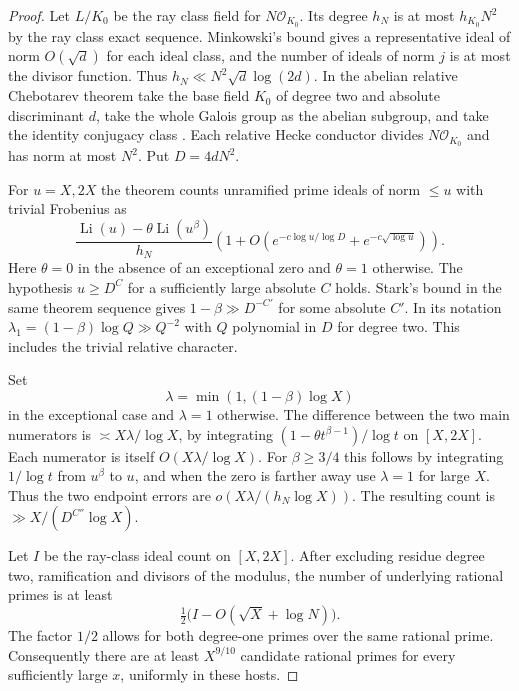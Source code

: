\begin{proof}
Let \(L/K_0\) be the ray class field for \(N\mathcal O_{K_0}\).
Its degree \(h_N\) is at most \(h_{K_0}N^2\) by the ray class
exact sequence. Minkowski's bound gives a representative ideal
of norm \(O(\sqrt d)\) for each ideal class, and the number of
ideals of norm \(j\) is at most the divisor function. Thus
\(h_N\ll N^2\sqrt d\log(2d)\).
In the abelian relative Chebotarev theorem take the base field
\(K_0\) of degree two and absolute discriminant \(d\), take
the whole Galois group as the abelian subgroup, and take the
identity conjugacy class \cite[Theorems 1.4 and 3.3]{tz-chebotarev}.
Each relative Hecke conductor divides \(N\mathcal O_{K_0}\)
and has norm at most \(N^2\). Put \(D=4dN^2\).

For
\(u=X,2X\) the theorem counts unramified prime ideals of norm
\(\le u\) with trivial Frobenius as
\[
 \frac{\operatorname{Li}(u)-\theta\operatorname{Li}(u^\beta)}
 {h_N}\left(1+O\left(
 e^{-c\log u/\log D}+e^{-c\sqrt{\log u}}\right)\right).
\]
Here \(\theta=0\) in the absence of an exceptional zero and
\(\theta=1\) otherwise. The hypothesis \(u\ge D^{C}\) for
a sufficiently large absolute \(C\) holds. Stark's bound in
the same theorem sequence gives \(1-\beta\gg D^{-C'}\) for
some absolute \(C'\). In its notation
\(\lambda_1=(1-\beta)\log Q\gg Q^{-2}\) with \(Q\) polynomial
in \(D\) for degree two. This includes the trivial relative
character.

Set
\[
 \lambda=\min(1,(1-\beta)\log X)
\]
in the exceptional
case and \(\lambda=1\) otherwise. The difference between the
two main numerators is \(\asymp X\lambda/\log X\), by integrating
\((1-\theta t^{\beta-1})/\log t\) on \([X,2X]\). Each numerator
is itself \(O(X\lambda/\log X)\). For \(\beta\ge3/4\) this
follows by integrating \(1/\log t\) from \(u^\beta\) to \(u\),
and when the zero is farther away use \(\lambda=1\) for large
\(X\). Thus the two endpoint errors are \(o(X\lambda/(h_N\log X))\).
The resulting count is \(\gg X/(D^{C''}\log X)\).

Let \(I\) be the ray-class ideal count on \([X,2X]\). After excluding residue degree two, ramification and divisors of the modulus, the number of underlying rational primes is at least
\[
 \tfrac12\bigl(I-O(\sqrt X+\log N)\bigr).
\]
The factor \(1/2\) allows for both degree-one primes over the same rational prime.
Consequently there are at least \(X^{9/10}\) candidate rational
primes for every sufficiently large \(x\), uniformly in these hosts.


\end{proof}

